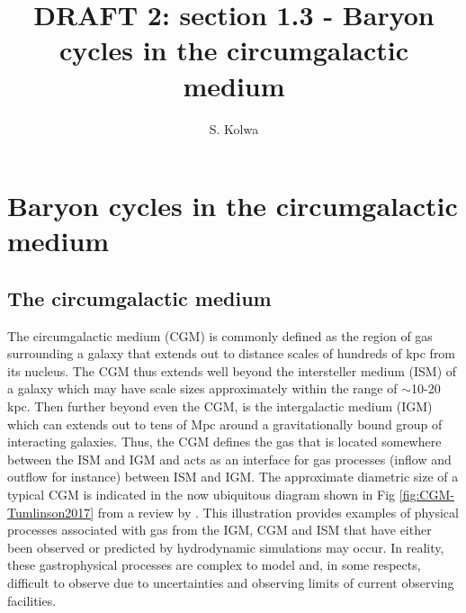 \documentclass[10pt,a4paper]{article}
\begin{document}
\title{{\bf DRAFT 2:} section 1.3 - Baryon cycles in the circumgalactic medium}
\author{S. Kolwa}
\maketitle


\section{Baryon cycles in the circumgalactic medium} 
\subsection{The circumgalactic medium} 
The circumgalactic medium (CGM) is commonly defined as the region of gas surrounding a galaxy that extends out to distance scales of hundreds of kpc from its nucleus. The CGM thus extends well beyond the intersteller medium (ISM) of a galaxy which may have scale sizes approximately within the range of $\sim$10-20 kpc. Then further beyond even the CGM, is the intergalactic medium (IGM) which can extends out to tens of Mpc around a gravitationally bound group of interacting galaxies. Thus, the CGM defines the gas that is located  somewhere between the ISM and IGM and acts as an interface for gas processes (inflow and outflow for instance) between ISM and IGM. The approximate diametric size of a typical CGM is indicated in the now ubiquitous diagram shown in Fig \ref{fig:CGM-Tumlinson2017} from a review by \citet{tumlinson2017}. This illustration provides examples of physical processes associated with gas from the IGM, CGM and ISM that have either been observed or predicted by hydrodynamic simulations may occur. In reality, these gastrophysical processes are complex to model and, in some respects, difficult to observe due to uncertainties and observing limits of current observing facilities. 
\end{document}
